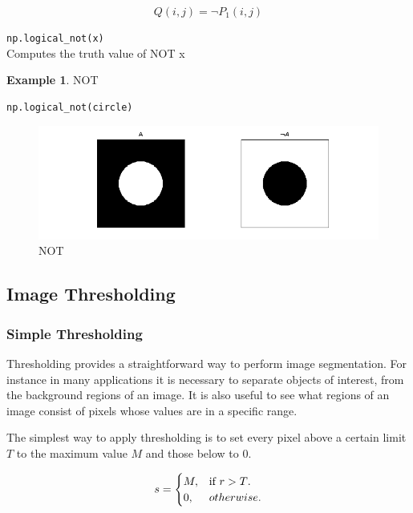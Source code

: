 \documentclass{article}
\theoremstyle{definition}
\newtheorem{ex}{Example}[subsection]
\theoremstyle{remark}
\newcommand{\func}[2]{\noindent\lstinline{#1}\\#2}
\begin{document}
\begin{equation}
    Q(i,j) = \neg P_1(i, j) 
\end{equation}

\func{np.logical_not(x)}{Computes the truth value of NOT x}

\begin{ex}NOT
\begin{lstlisting}[language=Python]
np.logical_not(circle)
\end{lstlisting}
\begin{figure}[H]
    \centering
    \includegraphics[width=\textwidth]{ocv_NOT}
    \caption{NOT}
    \label{fig:ocv_NOT}
\end{figure}
\end{ex}


\break


\subsection{Image Thresholding}

\subsubsection{Simple Thresholding}

Thresholding provides a straightforward way to perform image segmentation. For instance in many applications it is necessary to separate objects of interest, from the background regions of an image. It is also useful to see what regions of an image consist of pixels whose values are in a specific range.

The simplest way to apply thresholding is to set every pixel above a certain limit $ T $ to the maximum value $ M $ and those below to 0.

\begin{equation}
    s =\begin{cases}
    M, & \text{if $ r > T$}.\\
    0, & otherwise.
  \end{cases}
\end{equation}\\
\end{document}
